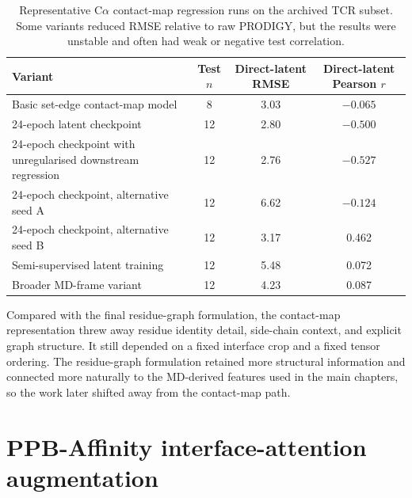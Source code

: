 \begin{table}[t]
\centering
\small
\begin{tabular}{|p{5.2cm}|c|c|c|}
\hline
Variant & Test $n$ & Direct-latent RMSE & Direct-latent Pearson $r$ \\
\hline
Basic set-edge contact-map model & 8 & 3.03 & $-0.065$ \\
24-epoch latent checkpoint & 12 & 2.80 & $-0.500$ \\
24-epoch checkpoint with unregularised downstream regression & 12 & 2.76 & $-0.527$ \\
24-epoch checkpoint, alternative seed A & 12 & 6.62 & $-0.124$ \\
24-epoch checkpoint, alternative seed B & 12 & 3.17 & 0.462 \\
Semi-supervised latent training & 12 & 5.48 & 0.072 \\
Broader MD-frame variant & 12 & 4.23 & 0.087 \\
\hline
\end{tabular}
\caption{Representative C$\alpha$ contact-map regression runs on the archived TCR subset. Some variants reduced RMSE relative to raw PRODIGY, but the results were unstable and often had weak or negative test correlation.}
\label{tab:appendix-contact}
\end{table}

Compared with the final residue-graph formulation, the contact-map representation threw away residue identity detail, side-chain context, and explicit graph structure. It still depended on a fixed interface crop and a fixed tensor ordering. The residue-graph formulation retained more structural information and connected more naturally to the MD-derived features used in the main chapters, so the work later shifted away from the contact-map path.

\section{PPB-Affinity interface-attention augmentation}

